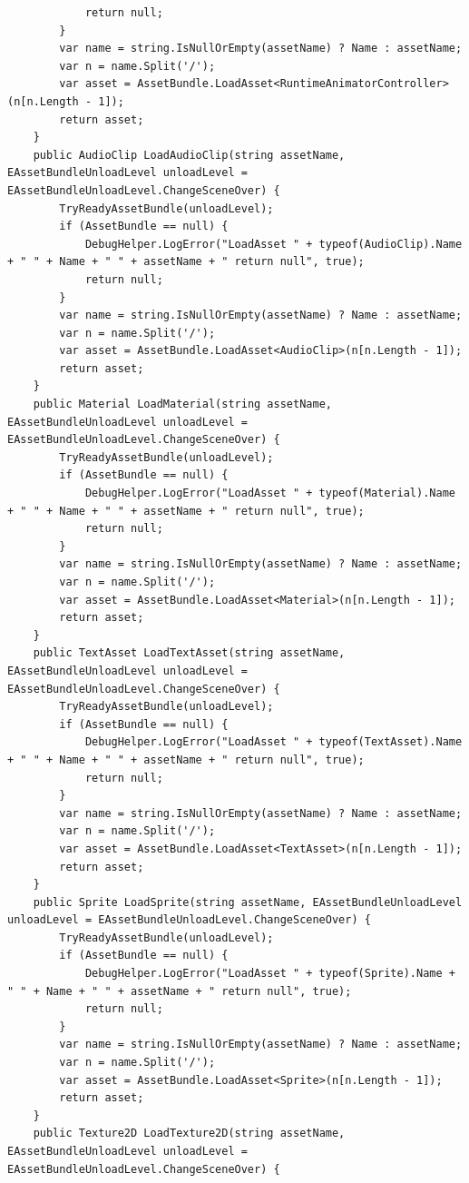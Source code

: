 \documentclass[9pt, b5paper]{article}
\begin{document}
\begin{itemize}
\begin{verbatim}
            return null;
        }
        var name = string.IsNullOrEmpty(assetName) ? Name : assetName;
        var n = name.Split('/');
        var asset = AssetBundle.LoadAsset<RuntimeAnimatorController>(n[n.Length - 1]);
        return asset;
    }
    public AudioClip LoadAudioClip(string assetName, EAssetBundleUnloadLevel unloadLevel = EAssetBundleUnloadLevel.ChangeSceneOver) {
        TryReadyAssetBundle(unloadLevel);
        if (AssetBundle == null) {
            DebugHelper.LogError("LoadAsset " + typeof(AudioClip).Name + " " + Name + " " + assetName + " return null", true);
            return null;
        }
        var name = string.IsNullOrEmpty(assetName) ? Name : assetName;
        var n = name.Split('/');
        var asset = AssetBundle.LoadAsset<AudioClip>(n[n.Length - 1]);
        return asset;
    }
    public Material LoadMaterial(string assetName, EAssetBundleUnloadLevel unloadLevel = EAssetBundleUnloadLevel.ChangeSceneOver) {
        TryReadyAssetBundle(unloadLevel);
        if (AssetBundle == null) {
            DebugHelper.LogError("LoadAsset " + typeof(Material).Name + " " + Name + " " + assetName + " return null", true);
            return null;
        }
        var name = string.IsNullOrEmpty(assetName) ? Name : assetName;
        var n = name.Split('/');
        var asset = AssetBundle.LoadAsset<Material>(n[n.Length - 1]);
        return asset;
    }
    public TextAsset LoadTextAsset(string assetName, EAssetBundleUnloadLevel unloadLevel = EAssetBundleUnloadLevel.ChangeSceneOver) {
        TryReadyAssetBundle(unloadLevel);
        if (AssetBundle == null) {
            DebugHelper.LogError("LoadAsset " + typeof(TextAsset).Name + " " + Name + " " + assetName + " return null", true);
            return null;
        }
        var name = string.IsNullOrEmpty(assetName) ? Name : assetName;
        var n = name.Split('/');
        var asset = AssetBundle.LoadAsset<TextAsset>(n[n.Length - 1]);
        return asset;
    }
    public Sprite LoadSprite(string assetName, EAssetBundleUnloadLevel unloadLevel = EAssetBundleUnloadLevel.ChangeSceneOver) {
        TryReadyAssetBundle(unloadLevel);
        if (AssetBundle == null) {
            DebugHelper.LogError("LoadAsset " + typeof(Sprite).Name + " " + Name + " " + assetName + " return null", true);
            return null;
        }
        var name = string.IsNullOrEmpty(assetName) ? Name : assetName;
        var n = name.Split('/');
        var asset = AssetBundle.LoadAsset<Sprite>(n[n.Length - 1]);
        return asset;
    }
    public Texture2D LoadTexture2D(string assetName, EAssetBundleUnloadLevel unloadLevel = EAssetBundleUnloadLevel.ChangeSceneOver) {

\end{verbatim}
\end{itemize}
\end{document}
